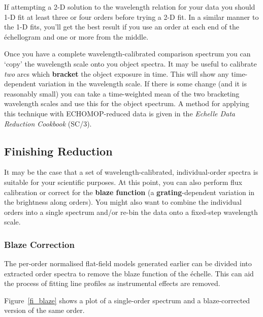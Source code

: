 \documentclass[twoside,11pt]{article}
\newcommand{\htmlref}[2]{#1}
\newcommand{\xref}[3]{#1}
\newcommand{\xlabel}[1]{}
\newcommand{\sgspec}[2]{#1}
\newcommand{\sgspec}[2]{#2}
\begin{document}
If attempting a 2-D solution to the wavelength relation for your data
you should 1-D fit at least three or four orders before trying a 2-D fit.
In a similar manner to the 1-D fits, you'll get the best result if you use
an order at each end of the \'{e}chellogram and one or more from the
middle.

Once you have a complete wavelength-calibrated comparison spectrum you
can `copy' the wavelength scale onto you object spectra.  It may be
useful to calibrate {\em two} arcs which \htmlref{{\bf bracket}}{gl_bracketing}
the object exposure in
time.  This will show any time-dependent variation in the wavelength
scale.  If there is some change (and it is reasonably small) you can
take a time-weighted mean of the two bracketing wavelength scales and use
this for the object spectrum.  A method for applying this technique
with \xref{ECHOMOP}{sun152}{}-reduced data is given in the
\xref{{\sl Echelle Data Reduction Cookbook} (SC/3)}{sc3}{MEANARC}\@.


\subsection{\label{se_finishing}\xlabel{finishing}Finishing Reduction}

It may be the case that a set of wavelength-calibrated, individual-order
spectra is suitable for your scientific purposes.  At this point, you
can also perform flux calibration or correct for the
\htmlref{{\bf blaze function}}{gl_blaze_correction} (a
\htmlref{{\bf grating}}{gl_grating}-dependent variation in the brightness along
orders).  You might also want to combine the individual orders into a single
spectrum and/or re-bin the data onto a fixed-step wavelength scale.

\subsubsection{Blaze Correction}

The per-order normalised flat-field models generated earlier can be
divided into extracted order spectra to remove the blaze function of the
\'{e}chelle.  This can aid the process of fitting line profiles as
instrumental effects are removed.

\sgspec{Figure~\ref{fi_blaze}}{The figure below} shows a plot of a
single-order spectrum and a blaze-corrected version of the same order.
\end{document}
